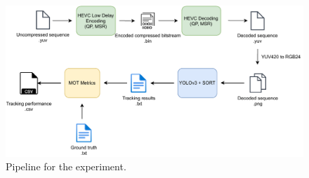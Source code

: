 \begin{figure}[!tb]
  \centering
  \includegraphics[width=1.0\linewidth]{img/experiment_pipeline.pdf}
  \caption[Pipeline for the experiment]
  {Pipeline for the experiment.}
  \label{fig:experiment_pipeline}
\end{figure}
